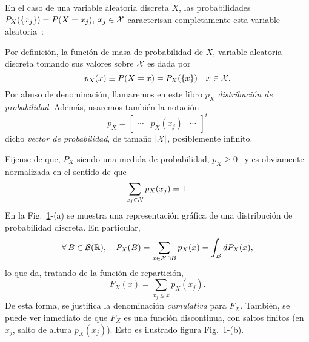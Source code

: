 En el  caso de una variable  aleatoria discreta $X$,  las probabilidades $P_X(\{
x_j \})  = P(X = x_j), \:  x_j \in \mathcal{X}$ caracterisan  completamente esta variable
aleatoria~\cite{AthLah06, HogMck13}:
%
\begin{definicion}
  Por  definici\'on, la  funci\'on  de  masa de  probabilidad  de $X$,  variable
  aleatoria discreta tomando sus valores sobre $\mathcal{X}$ es dada por
  \[
  p_X(x) \equiv P(X = x) = P_X( \{ x\} ) \quad x \in \mathcal{X}.
  \]
  Por   abuso  de   denominaci\'on,  llamaremos   en  este   libro   $p_X$  {\it
    distribuci\'on de probabilidad}. Adem\'as, usaremos tambi\'en la notaci\'on
  \[
  p_X = \begin{bmatrix} \cdots & p_X(x_j) & \cdots \end{bmatrix}^t
  \]
  dicho {\it vector de probabilidad}, de tama\~no $|\mathcal{X}|$, posiblemente infinito.
\end{definicion}
%
Fijense de  que, $P_X$ siendo  una medida  de probabilidad, $p_X  \ge 0$ \  y es
obviamente normalizada en el sentido de que
%
\[
\sum_{x_j \in \mathcal{X}} p_X(x_j) = 1.
\]
%
En  la  Fig.~\ref{Fig:MP:ProbaDiscreta}-(a)   se  muestra  una  representaci\'on
gr\'afica de una distribuci\'on de probabilidad discreta.
%
En particular,
%
\[
\forall \,  B \in  \mathcal{B}(\mathbb{R}), \quad  P_X(B) = \sum_{x  \in \mathcal{X}  \cap B}  p_X(x) =
\int_B dP_X(x),
\]
%
lo que da, tratando de la funci\'on de repartici\'on,
%
\[
F_X(x) = \sum_{x_j \le x} p_X(x_j).
\]
%
De  esta forma,  se justifica  la  denominaci\'on {\it  cumulativa} para  $F_X$.
Tambi\'en, se puede ver inmediato de que $F_X$ es una funci\'on discontinua, con
saltos finitos (en  $x_j$, salto de altura $p_X(x_j)$).  Esto es ilustrado figura
Fig.~\ref{Fig:MP:ProbaDiscreta}-(b).

\begin{figure}[h!]
\begin{center}  \end{center}
%
\label{Fig:MP:ProbaDiscreta}
\end{figure}

